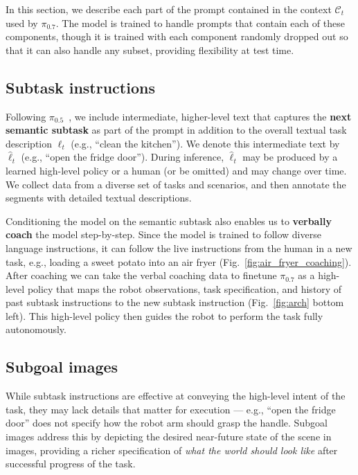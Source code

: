 \documentclass[conference]{IEEEtran}
\newcommand{\rawtext}{\hat{\ell}} %
\def \Pizf {$\pi_{0.5}$}
\def \MethodName {$\pi_{0.7}$}
\begin{document}
In this section, we describe each part of the prompt contained in the context $\mathcal{C}_t$ used by \MethodName{}. The model is trained to handle prompts that contain each of these components, though it is trained with each component randomly dropped out so that it can also handle any subset, providing flexibility at test time.

\subsection{Subtask instructions}
\label{subsec:hl}
Following \Pizf\ \cite{black2025pi05}, we include intermediate, higher-level text that captures the \textbf{next semantic subtask} as part of the prompt in addition to the overall textual task description $\ell_t$ (e.g., ``clean the kitchen''). We denote this intermediate text by $\rawtext_t$ (e.g., ``open the fridge door''). During inference, $\rawtext_t$ may be produced by a learned high-level policy or a human (or be omitted) and may change over time.
We collect data from a diverse set of tasks and scenarios, and then annotate the segments with detailed textual descriptions.

Conditioning the model on the semantic subtask also enables us to \textbf{verbally coach} the model step-by-step. Since the model is trained to follow diverse language instructions, it can follow the live instructions from the human in a new task, e.g., loading a sweet potato into an air fryer (Fig.~\ref{fig:air_fryer_coaching}). After coaching we can take the verbal coaching data to finetune \MethodName{} as a high-level policy that maps the robot observations, task specification, and history of past subtask instructions to the new subtask instruction (Fig.~\ref{fig:arch} bottom left). This high-level policy then guides the robot to perform the task fully autonomously.

\subsection{Subgoal images}

While subtask instructions are effective at conveying the high-level intent of the task, they may lack details that matter for execution --- e.g., ``open the fridge door'' does not specify how the robot arm should grasp the handle. Subgoal images address this by depicting the desired near-future state of the scene in images, providing a richer specification of \emph{what the world should look like} after successful progress of the task.
\end{document}
